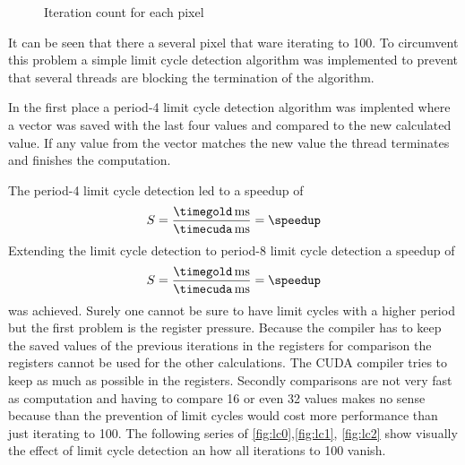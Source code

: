 \begin{figure}[ht] \centering
\caption{Iteration count for each pixel}
\label{fig:lc}%
\end{figure}

It can be seen that there a several pixel that ware iterating to 100. To circumvent
this problem a simple limit cycle detection algorithm was implemented to prevent
that several threads are blocking the termination of the algorithm. 

In the first place a period-4 limit cycle detection algorithm was implented where
a vector was saved with the last four values and compared to the new calculated 
value. If any value from the vector matches the new value the thread terminates
and finishes the computation. 

The period-4 limit cycle detection led to a speedup of 
\fpDiv{\speedup}{\timegold}{\timecuda}
\begin{equation*}\label{eq:speedup9}
	S = \frac{\unit[\timegold]{ms}}{\unit[\timecuda]{ms}} = \speedup
\end{equation*}
Extending the limit cycle detection to period-8 limit cycle detection a speedup
of 
\fpDiv{\speedup}{\timegold}{\timecuda}
\begin{equation*}\label{eq:speedup10}
	S = \frac{\unit[\timegold]{ms}}{\unit[\timecuda]{ms}} = \speedup
\end{equation*}
was achieved. Surely one cannot be sure to have limit cycles with a higher
period but the first problem is the register pressure. Because the compiler has
to keep the saved values of the previous iterations in the registers for
comparison the registers cannot be used for the other calculations. The
\gls{CUDA} compiler tries to keep as much as possible in the registers. Secondly
comparisons are not very fast as computation and having to compare 16 or even 32
values makes no sense because than the prevention of limit cycles would cost
more performance than just iterating to 100. The following series of
\autoref{fig:lc0},\autoref{fig:lc1}, \autoref{fig:lc2} show visually the effect
of limit cycle detection an how all iterations to 100 vanish.

